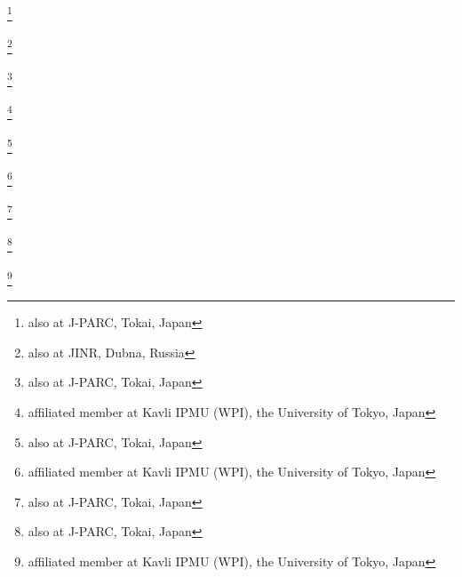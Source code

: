 \author{Y.\,Oyama}\thanks{also at J-PARC, Tokai, Japan}\INSTCB
\author{V.\,Palladino}\INSTBE
\author{J.L.\,Palomino}\INSTFJ
\author{V.\,Paolone}\INSTGC
\author{D.\,Payne}\INSTFC
\author{G.F.\,Pearce}\INSTEH
\author{O.\,Perevozchikov}\INSTFI
\author{J.D.\,Perkin}\INSTFB
\author{Y.\,Petrov}\INSTD
\author{L.\,Pickard}\INSTFB
\author{E.S.\,Pinzon Guerra}\INSTH
\author{C.\,Pistillo}\INSTEE
\author{P.\,Plonski}\INSTDH
\author{E.\,Poplawska}\INSTFA
\author{B.\,Popov}\thanks{also at JINR, Dubna, Russia}\INSTBB
\author{M.\,Posiadala-Zezula}\INSTDJ
\author{J.-M.\,Poutissou}\INSTB
\author{R.\,Poutissou}\INSTB
\author{P.\,Przewlocki}\INSTDF
\author{B.\,Quilain}\INSTBA
\author{E.\,Radicioni}\INSTGF
\author{P.N.\,Ratoff}\INSTEJ
\author{M.\,Ravonel}\INSTEG
\author{M.A.M.\,Rayner}\INSTEG
\author{A.\,Redij}\INSTEE
\author{M.\,Reeves}\INSTEJ
\author{E.\,Reinherz-Aronis}\INSTFG
\author{C.\,Riccio}\INSTBE
\author{F.\,Retiere}\INSTB
\author{A.\,Robert}\INSTBB
\author{P.A.\,Rodrigues}\INSTGD
\author{P.\,Rojas}\INSTFG
\author{E.\,Rondio}\INSTDF
\author{S.\,Roth}\INSTBC
\author{A.\,Rubbia}\INSTEF
\author{D.\,Ruterbories}\INSTGD
\author{R.\,Sacco}\INSTFA
\author{K.\,Sakashita}\thanks{also at J-PARC, Tokai, Japan}\INSTCB
\author{F.\,S\'anchez}\INSTED
\author{F.\,Sato}\INSTCB
\author{E.\,Scantamburlo}\INSTEG
\author{K.\,Scholberg}\thanks{affiliated member at Kavli IPMU (WPI), the University of Tokyo, Japan}\INSTFH
\author{S.\,Schoppmann}\INSTBC
\author{J.\,Schwehr}\INSTFG
\author{M.\,Scott}\INSTB
\author{Y.\,Seiya}\INSTCF
\author{T.\,Sekiguchi}\thanks{also at J-PARC, Tokai, Japan}\INSTCB
\author{H.\,Sekiya}\thanks{affiliated member at Kavli IPMU (WPI), the University of Tokyo, Japan}\INSTBJ\INSTHA
\author{D.\,Sgalaberna}\INSTEF
\author{F.\,Shaker}\INSTGH
\author{M.\,Shiozawa}\INSTBJ\INSTHA
\author{S.\,Short}\INSTFA
\author{Y.\,Shustrov}\INSTEB
\author{P.\,Sinclair}\INSTEI
\author{B.\,Smith}\INSTEI
\author{R.J.\,Smith}\INSTGG
\author{M.\,Smy}\INSTGA
\author{J.T.\,Sobczyk}\INSTEA
\author{H.\,Sobel}\INSTGA\INSTHA
\author{M.\,Sorel}\INSTEC
\author{L.\,Southwell}\INSTEJ
\author{P.\,Stamoulis}\INSTEC
\author{J.\,Steinmann}\INSTBC
\author{B.\,Still}\INSTFA
\author{Y.\,Suda}\INSTCH
\author{A.\,Suzuki}\INSTCC
\author{K.\,Suzuki}\INSTCD
\author{S.Y.\,Suzuki}\thanks{also at J-PARC, Tokai, Japan}\INSTCB
\author{Y.\,Suzuki}\INSTHA\INSTHA
\author{T.\,Szeglowski}\INSTDI
\author{R.\,Tacik}\INSTE\INSTB
\author{M.\,Tada}\thanks{also at J-PARC, Tokai, Japan}\INSTCB
\author{S.\,Takahashi}\INSTCD
\author{A.\,Takeda}\INSTBJ
\author{Y.\,Takeuchi}\INSTCC\INSTHA
\author{H.K.\,Tanaka}\thanks{affiliated member at Kavli IPMU (WPI), the University of Tokyo, Japan}\INSTBJ
